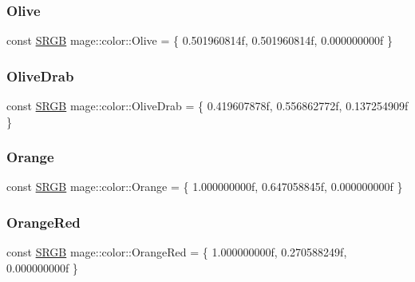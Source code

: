 \hypertarget{namespacemage_1_1color_a9dde379c69800de744e90a45b4bbbe0f}{}\label{namespacemage_1_1color_a9dde379c69800de744e90a45b4bbbe0f} 
\subsubsection{\texorpdfstring{Olive}{Olive}}
{\footnotesize\ttfamily const \hyperlink{structmage_1_1_s_r_g_b}{S\+R\+GB} mage\+::color\+::\+Olive = \{ 0.\+501960814f, 0.\+501960814f, 0.\+000000000f \}}

\hypertarget{namespacemage_1_1color_a77c1bc650b6099a4f9a83e295c8275fe}{}\label{namespacemage_1_1color_a77c1bc650b6099a4f9a83e295c8275fe} 
\subsubsection{\texorpdfstring{Olive\+Drab}{OliveDrab}}
{\footnotesize\ttfamily const \hyperlink{structmage_1_1_s_r_g_b}{S\+R\+GB} mage\+::color\+::\+Olive\+Drab = \{ 0.\+419607878f, 0.\+556862772f, 0.\+137254909f \}}

\hypertarget{namespacemage_1_1color_afa85dcd9e84a70ecb064915fd5a8d79a}{}\label{namespacemage_1_1color_afa85dcd9e84a70ecb064915fd5a8d79a} 
\subsubsection{\texorpdfstring{Orange}{Orange}}
{\footnotesize\ttfamily const \hyperlink{structmage_1_1_s_r_g_b}{S\+R\+GB} mage\+::color\+::\+Orange = \{ 1.\+000000000f, 0.\+647058845f, 0.\+000000000f \}}

\hypertarget{namespacemage_1_1color_a16c7871268b776271de85e64d16b176b}{}\label{namespacemage_1_1color_a16c7871268b776271de85e64d16b176b} 
\subsubsection{\texorpdfstring{Orange\+Red}{OrangeRed}}
{\footnotesize\ttfamily const \hyperlink{structmage_1_1_s_r_g_b}{S\+R\+GB} mage\+::color\+::\+Orange\+Red = \{ 1.\+000000000f, 0.\+270588249f, 0.\+000000000f \}}

